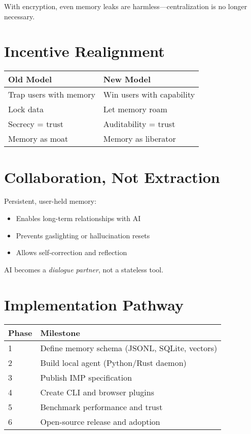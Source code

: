 \documentclass[11pt]{article}
\begin{document}
With encryption, even memory leaks are harmless—centralization is no longer necessary.

\section{Incentive Realignment}
\begin{center}
\begin{tabular}{@{}ll@{}}
\toprule
\textbf{Old Model} & \textbf{New Model} \\
\midrule
Trap users with memory & Win users with capability \\
Lock data & Let memory roam \\
Secrecy = trust & Auditability = trust \\
Memory as moat & Memory as liberator \\
\bottomrule
\end{tabular}
\end{center}

\section{Collaboration, Not Extraction}
Persistent, user-held memory:
\begin{itemize}[nosep]
    \item Enables long-term relationships with AI
    \item Prevents gaslighting or hallucination resets
    \item Allows self-correction and reflection
\end{itemize}

AI becomes a \textit{dialogue partner}, not a stateless tool.

\section{Implementation Pathway}
\begin{center}
\begin{tabular}{@{}ll@{}}
\toprule
\textbf{Phase} & \textbf{Milestone} \\
\midrule
1 & Define memory schema (JSONL, SQLite, vectors) \\
2 & Build local agent (Python/Rust daemon) \\
3 & Publish IMP specification \\
4 & Create CLI and browser plugins \\
5 & Benchmark performance and trust \\
6 & Open-source release and adoption \\
\bottomrule
\end{tabular}
\end{center}
\end{document}
